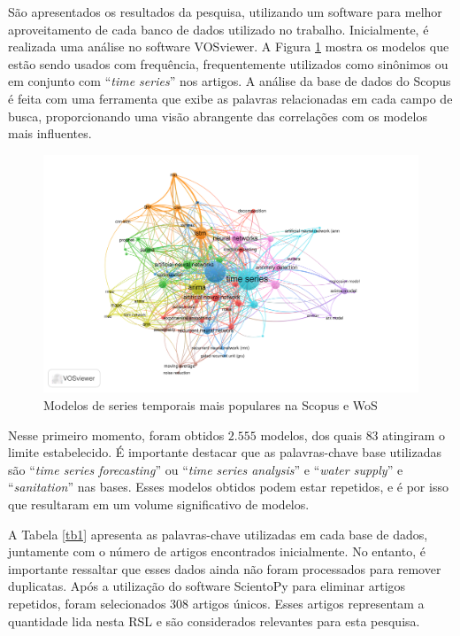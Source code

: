 São apresentados os resultados da pesquisa, utilizando um software para melhor aproveitamento de cada banco de dados utilizado no trabalho. Inicialmente, é realizada uma análise no software VOSviewer.
A Figura \ref{fig:scopus-09-08} mostra os modelos que estão sendo usados com frequência, frequentemente utilizados como sinônimos ou em conjunto com ``\textit{time series}'' nos artigos. A análise da base de dados do Scopus é feita com uma ferramenta que exibe as palavras relacionadas em cada campo de busca, proporcionando uma visão abrangente das correlações com os modelos mais influentes.

\begin{figure}[H]
	\centering
	\caption{Modelos de series temporais mais populares na Scopus e WoS }
	\label{fig:scopus-09-08}
	\includegraphics[width=0.8\linewidth]{Revisao/Figuras/base-wos-scopus}
	
\end{figure}

Nesse primeiro momento, foram obtidos $2.555$ modelos, dos quais $83$ atingiram o limite estabelecido. É importante destacar que as palavras-chave base utilizadas são ``\textit{time series forecasting}'' ou ``\textit{time series analysis}'' e ``\textit{water supply}'' e ``\textit{sanitation}'' nas bases. Esses modelos obtidos podem estar repetidos, e é por isso que resultaram em um volume significativo de modelos.


A Tabela \ref{tb1} apresenta as palavras-chave utilizadas em cada base de dados, juntamente com o número de artigos encontrados inicialmente. No entanto, é importante ressaltar que esses dados ainda não foram processados para remover duplicatas. Após a utilização do software ScientoPy \cite{scientopy} para eliminar artigos repetidos, foram selecionados $308$ artigos únicos. Esses artigos representam a quantidade lida nesta RSL e são considerados relevantes para esta pesquisa.



